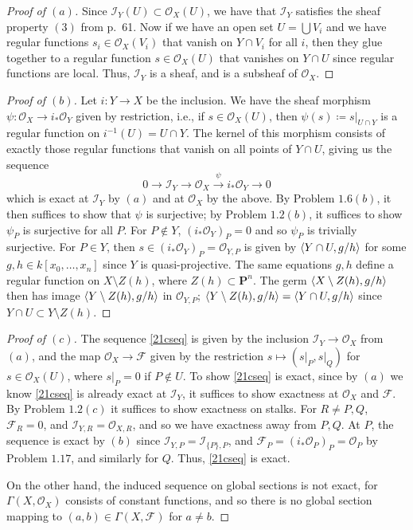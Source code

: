 \documentclass[12pt,letterpaper]{article}
\theoremstyle{definition}
\theoremstyle{remark}
\numberwithin{equation}{section}
\numberwithin{figure}{problem}
\newcommand{\OO}{\mathcal{O}}
\begin{document}
\begin{proof}[Proof of $(a)$]
  Since $\mathscr{I}_Y(U) \subset \OO_X(U)$, we have that $\mathscr{I}_Y$ satisfies the sheaf property $(3)$ from p.~61. Now if we have an open set $U = \bigcup V_i$ and we have regular functions $s_i \in \OO_X(V_i)$ that vanish on $Y \cap V_i$ for all $i$, then they glue together to a regular function $s \in \OO_X(U)$ that vanishes on $Y \cap U$ since regular functions are local. Thus, $\mathscr{I}_Y$ is a sheaf, and is a subsheaf of $\OO_X$.
\end{proof}
\begin{proof}[Proof of $(b)$]
  Let $i\colon Y \to X$ be the inclusion. We have the sheaf morphism $\psi\colon \OO_X \to i_*\OO_Y$ given by restriction, i.e., if $s \in \OO_X(U)$, then $\psi(s) \coloneqq s\vert_{U \cap Y}$ is a regular function on $i^{-1}(U) = U \cap Y$. The kernel of this morphism consists of exactly those regular functions that vanish on all points of $Y \cap U$, giving us the sequence
  \begin{equation*}
    0 \to \mathscr{I}_Y \to \OO_X \overset{\psi}{\to} i_*\OO_Y \to 0
  \end{equation*}
  which is exact at $\mathscr{I}_Y$ by $(a)$ and at $\OO_X$ by the above. By Problem $1.6(b)$, it then suffices to show that $\psi$ is surjective; by Problem $1.2(b)$, it suffices to show $\psi_P$ is surjective for all $P$. For $P \notin Y$, $(i_*\OO_Y)_P = 0$ and so $\psi_P$ is trivially surjective. For $P \in Y$, then $s \in (i_*\OO_Y)_P = \OO_{Y,P}$ is given by $\braket{Y \cap U,g/h}$ for some $g,h \in k[x_0,\ldots,x_n]$ since $Y$ is quasi-projective. The same equations $g,h$ define a regular function on $X \setminus Z(h)$, where $Z(h) \subset \mathbf{P}^n$. The germ $\braket{X \setminus Z(h),g/h}$ then has image $\braket{Y \setminus Z(h),g/h}$ in $\OO_{Y,P}$; $\braket{Y \setminus Z(h),g/h} = \braket{Y \cap U,g/h}$ since $Y \cap U \subset Y \setminus Z(h)$.
\end{proof}
\begin{proof}[Proof of $(c)$]
  The sequence \eqref{21cseq} is given by the inclusion $\mathscr{I}_Y \to \OO_X$ from $(a)$, and the map $\OO_X \to \mathscr{F}$ given by the restriction $s \mapsto (s\vert_P,s\vert_Q)$ for $s \in \OO_X(U)$, where $s\vert_P = 0$ if $P \notin U$. To show \eqref{21cseq} is exact, since by $(a)$ we know \eqref{21cseq} is already exact at $\mathscr{I}_Y$, it suffices to show exactness at $\OO_X$ and $\mathscr{F}$. By Problem $1.2(c)$ it suffices to show exactness on stalks. For $R \ne P,Q$, $\mathscr{F}_R = 0$, and $\mathscr{I}_{Y,R} = \OO_{X,R}$, and so we have exactness away from $P,Q$. At $P$, the sequence is exact by $(b)$ since $\mathscr{I}_{Y,P} = \mathscr{I}_{\{P\},P}$, and $\mathscr{F}_P = (i_*\OO_P)_P = \OO_P$ by Problem $1.17$, and similarly for $Q$. Thus, \eqref{21cseq} is exact.
  \par On the other hand, the induced sequence on global sections is not exact, for $\Gamma(X,\OO_X)$ consists of constant functions, and so there is no global section mapping to $(a,b) \in \Gamma(X,\mathscr{F})$ for $a \ne b$.
\end{proof}
\end{document}
